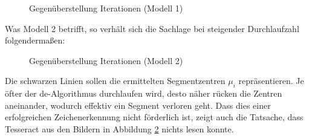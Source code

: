 \begin{figure}[H]
				\caption{Gegenüberstellung Iterationen (Modell 1) }\label{fig:iterations-compare1}
			\end{figure}
			Was Modell 2 betrifft, so verhält sich die Sachlage bei steigender Durchlaufzahl folgendermaßen:
			\begin{figure}[H]
				\centering
				
				\caption{Gegenüberstellung Iterationen (Modell 2)}
				\label{fig:iterations-compare2}
			\end{figure}
			Die schwarzen Linien sollen die ermittelten Segmentzentren $\mu_{i}$ repräsentieren. Je öfter der \gls{de}-Algorithmus durchlaufen wird, desto näher rücken die Zentren aneinander, wodurch effektiv ein Segment verloren geht. Dass dies einer erfolgreichen Zeichenerkennung nicht förderlich ist, zeigt auch die Tatsache, dass Tesseract aus den Bildern in Abbildung \ref{fig:iterations-compare2} nichts lesen konnte.